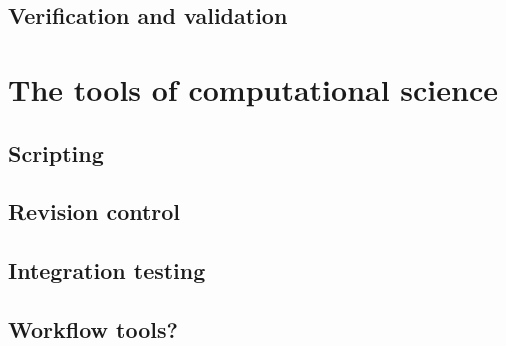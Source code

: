 \documentclass[a4paper,12pt]{article}
\theoremstyle{definition}
\begin{document}
\subsection{Verification and validation}





\section{The tools of computational science}

\subsection{Scripting}

\subsection{Revision control}

\subsection{Integration testing}

\subsection{Workflow tools?}
\end{document}

